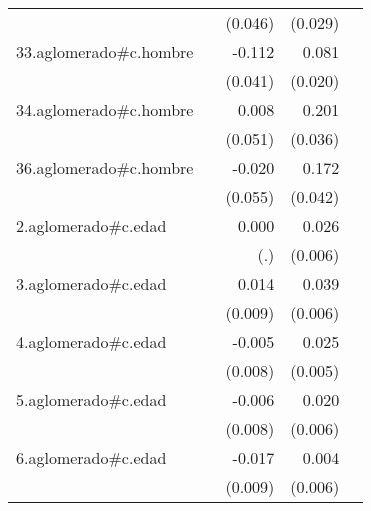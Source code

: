{\begin{longtable}{l*{4}{D{.}{.}{-1}}}
            &                     &     (0.046)         &     (0.029)         &                     \\
\addlinespace
33.aglomerado#c.hombre&                     &      -0.112\sym{**} &       0.081\sym{***}&                     \\
            &                     &     (0.041)         &     (0.020)         &                     \\
\addlinespace
34.aglomerado#c.hombre&                     &       0.008         &       0.201\sym{***}&                     \\
            &                     &     (0.051)         &     (0.036)         &                     \\
\addlinespace
36.aglomerado#c.hombre&                     &      -0.020         &       0.172\sym{***}&                     \\
            &                     &     (0.055)         &     (0.042)         &                     \\
\addlinespace
2.aglomerado#c.edad&                     &       0.000         &       0.026\sym{***}&                     \\
            &                     &         (.)         &     (0.006)         &                     \\
\addlinespace
3.aglomerado#c.edad&                     &       0.014         &       0.039\sym{***}&                     \\
            &                     &     (0.009)         &     (0.006)         &                     \\
\addlinespace
4.aglomerado#c.edad&                     &      -0.005         &       0.025\sym{***}&                     \\
            &                     &     (0.008)         &     (0.005)         &                     \\
\addlinespace
5.aglomerado#c.edad&                     &      -0.006         &       0.020\sym{***}&                     \\
            &                     &     (0.008)         &     (0.006)         &                     \\
\addlinespace
6.aglomerado#c.edad&                     &      -0.017         &       0.004         &                     \\
            &                     &     (0.009)         &     (0.006)         &                     \\

\end{longtable}}
